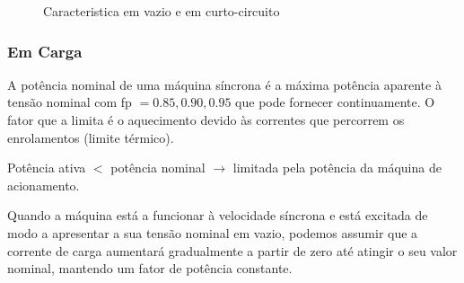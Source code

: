 \begin{figure}[H]
{
    }
    \caption{Caracteristica em vazio e em curto-circuito}
    \label{fig:maq-sincrona-vazio-e-cc}
\end{figure}

\clearpage
\subsubsection{Em Carga}

\noindent A potência nominal de uma máquina síncrona  é a máxima potência aparente à tensão nominal com fp $= 0.85,0.90, 0.95$ que pode fornecer continuamente. O fator que a limita é o aquecimento devido às correntes que percorrem os enrolamentos (limite térmico).

\begin{mdframed}
    \hfil Potência ativa $<$ potência nominal $\rightarrow$ limitada pela potência da máquina de acionamento.
\end{mdframed}

\noindent Quando a máquina está a funcionar à velocidade síncrona e está excitada de modo a apresentar a sua tensão nominal em vazio, podemos assumir que a corrente de carga aumentará gradualmente a partir de zero até atingir o seu valor nominal, mantendo um fator de potência constante.

